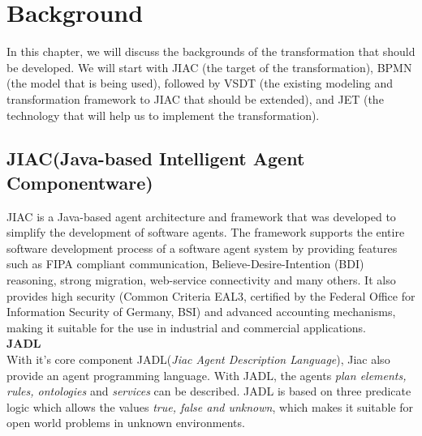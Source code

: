 \chapter{Background}

In this chapter, we will discuss the backgrounds of the transformation that should be developed. We will start with JIAC (the target of the transformation), BPMN (the model that is being used), followed by VSDT (the existing modeling and transformation framework to JIAC that should be extended), and JET (the technology that will help us to implement the transformation).

\section{JIAC(Java-based Intelligent Agent Componentware)}
JIAC is a Java-based agent architecture and framework that was developed to simplify the development of software agents. The framework supports the entire software development process of a software agent system by providing features such as FIPA compliant communication, Believe-Desire-Intention (BDI) reasoning, strong migration, web-service
connectivity and many others. It also provides high security (Common Criteria EAL3,
certified by the Federal Office for Information Security of Germany, BSI) and advanced
accounting mechanisms, making it suitable for the use in industrial and
commercial applications.\\

\textbf{JADL}\\
With it's core component JADL(\textit{Jiac Agent Description Language}), Jiac also provide an agent programming language. With JADL, the agents \textit{plan elements, rules, ontologies} and \textit{services} can be described. JADL is based on three predicate logic which allows the values \textit{true, false and unknown}, which makes it suitable for open world problems in unknown environments.
\\

